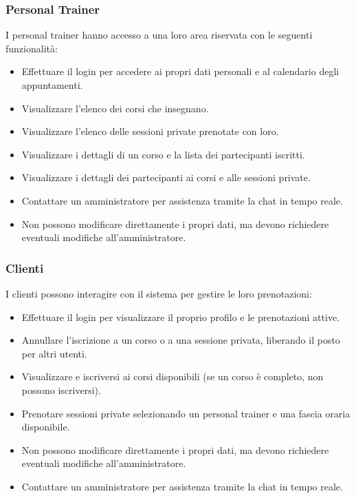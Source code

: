 \documentclass{report}
\begin{document}
\subsubsection{Personal Trainer}
\par I personal trainer hanno accesso a una loro area riservata con le seguenti funzionalità:
\begin{itemize}
    \item Effettuare il login per accedere ai propri dati personali e al calendario degli appuntamenti.
    \item Visualizzare l'elenco dei corsi che insegnano.
    \item Visualizzare l'elenco delle sessioni private prenotate con loro.
    \item Visualizzare i dettagli di un corso e la lista dei partecipanti iscritti.
    \item Visualizzare i dettagli dei partecipanti ai corsi e alle sessioni private.
    \item Contattare un amministratore per assistenza tramite la chat in tempo reale.
    \item Non possono modificare direttamente i propri dati, ma devono richiedere eventuali modifiche all'amministratore.
\end{itemize}
\subsubsection{Clienti}
\par I clienti possono interagire con il sistema per gestire le loro prenotazioni:
\begin{itemize}
    \item Effettuare il login per visualizzare il proprio profilo e le prenotazioni attive.
    \item Annullare l'iscrizione a un corso o a una sessione privata, liberando il posto per altri utenti.
    \item Visualizzare e iscriversi ai corsi disponibili (se un corso è completo, non possono iscriversi).
    \item Prenotare sessioni private selezionando un personal trainer e una fascia oraria disponibile.
    \item Non possono modificare direttamente i propri dati, ma devono richiedere eventuali modifiche all'amministratore.
    \item Contattare un amministratore per assistenza tramite la chat in tempo reale.
\end{itemize}
\end{document}
